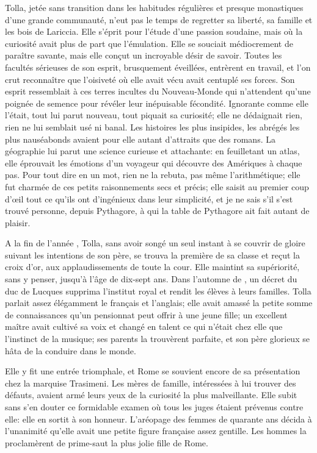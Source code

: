 Tolla, jetée sans transition dans les habitudes régulières et presque monastiques d’une grande communauté, n’eut pas le temps de regretter sa liberté, sa famille et les bois de Lariccia. Elle s’éprit pour l’étude d’une passion soudaine, mais où la curiosité avait plus de part que l’émulation. Elle se souciait médiocrement de paraître savante, mais elle conçut un incroyable désir de savoir. Toutes les facultés sérieuses de son esprit, brusquement éveillées, entrèrent en travail, et l’on crut reconnaître que l’oisiveté où elle avait vécu avait centuplé ses forces. Son esprit ressemblait à ces terres incultes du Nouveau-Monde qui n’attendent qu’une poignée de semence pour révéler leur inépuisable fécondité. Ignorante comme elle l’était, tout lui parut nouveau, tout piquait sa curiosité; elle ne dédaignait rien, rien ne lui semblait usé ni banal. Les histoires les plus insipides, les abrégés les plus nauséabonds avaient pour elle autant d’attraits que des romans. La géographie lui parut une science curieuse et attachante: en feuilletant un atlas, elle éprouvait les émotions d’un voyageur qui découvre des Amériques à chaque pas. Pour tout dire en un mot, rien ne la rebuta, pas même l’arithmétique; elle fut charmée de ces petits raisonnements secs et précis; elle saisit au premier coup d’œil tout ce qu’ils ont d’ingénieux dans leur simplicité, et je ne sais s’il s’est trouvé personne, depuis Pythagore, à qui la table de Pythagore ait fait autant de plaisir.

A la fin de l’année , Tolla, sans avoir songé un seul instant à se couvrir de gloire suivant les intentions de son père, se trouva la première de sa classe et reçut la croix d’or, aux applaudissements de toute la cour. Elle maintint sa supériorité, sans y penser, jusqu’à l’âge de dix-sept ans. Dans l’automne de , un décret du duc de Lucques supprima l’institut royal et rendit les élèves à leurs familles. Tolla parlait assez élégamment le français et l’anglais; elle avait amassé la petite somme de connaissances qu’un pensionnat peut offrir à une jeune fille; un excellent maître avait cultivé sa voix et changé en talent ce qui n’était chez elle que l’instinct de la musique; ses parents la trouvèrent parfaite, et son père glorieux se hâta de la conduire dans le monde.

Elle y fit une entrée triomphale, et Rome se souvient encore de sa présentation chez la marquise Trasimeni. Les mères de famille, intéressées à lui trouver des défauts, avaient armé leurs yeux de la curiosité la plus malveillante. Elle subit sans s’en douter ce formidable examen où tous les juges étaient prévenus contre elle: elle en sortit à son honneur. L’aréopage des femmes de quarante ans décida à l’unanimité qu’elle avait une petite figure française assez gentille. Les hommes la proclamèrent de prime-saut la plus jolie fille de Rome.

